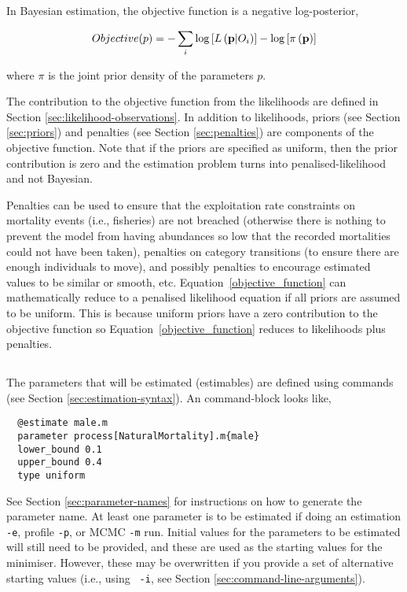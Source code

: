 In Bayesian estimation, the objective function is a negative log-posterior,

\begin{equation}\label{objective_function}
Objective(p)= - \sum\limits_i {\log \left[ {L\left( {{\bf{p}}|O_i } \right)} \right]}  - \log \left[ {\pi \left( {\bf{p}} \right)} \right]
\end{equation}

where $\pi$ is the joint prior density of the parameters $p$.

The contribution to the objective function from the likelihoods are defined in Section \ref{sec:likelihood-observations}. In addition to likelihoods, priors (see Section \ref{sec:priors}) and penalties (see Section \ref{sec:penalties}) are components of the objective function. Note that if the priors are specified as uniform, then the prior contribution is zero and the estimation problem turns into penalised-likelihood and not Bayesian.

Penalties can be used to ensure that the exploitation rate constraints on mortality events (i.e., fisheries) are not breached (otherwise there is nothing to prevent the model from having abundances so low that the recorded mortalities could not have been taken), penalties on category transitions (to ensure there are enough individuals to move), and possibly penalties to encourage estimated values to be similar or smooth, etc. Equation~\ref{objective_function} can mathematically reduce to a penalised likelihood equation if all priors are assumed to be uniform. This is because uniform priors have a zero contribution to the objective function so Equation~\ref{objective_function} reduces to likelihoods plus penalties.

\subsection{\label{sec:estimate-free-parameters}}
The parameters that will be estimated (estimables) are defined using  commands (see Section \ref{sec:estimation-syntax}). An  command-block looks like,

{\small{\begin{verbatim}
  @estimate male.m
  parameter process[NaturalMortality].m{male}
  lower_bound 0.1
  upper_bound 0.4
  type uniform
\end{verbatim}}}

See Section \ref{sec:parameter-names} for instructions on how to generate the parameter name. At least one parameter is to be estimated if doing an estimation \texttt{-e}, profile \texttt{-p}, or MCMC \texttt{-m} run. Initial values for the parameters to be estimated will still need to be provided, and these are used as the starting values for the minimiser. However, these may be overwritten if you provide a set of alternative starting values (i.e., using  \texttt{\cname\ -i}, see Section \ref{sec:command-line-arguments}).

